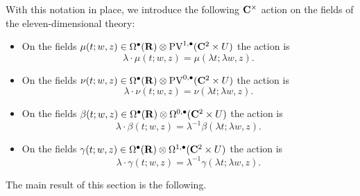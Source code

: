 \documentclass[11pt]{amsart}
\begin{document}
With this notation in place, we introduce the following $\mathbf{C}^\times$ action on the fields of the eleven-dimensional theory:
\begin{itemize}
\item On the fields $\mu(t;w,z) \in \Omega^\bullet(\mathbf{R}) \otimes {\rm PV}^{1,\bullet}(\mathbf{C}^2 \times U)$ the action is
\[
\lambda \cdot \mu(t;w,z) = \mu(\lambda t;\lambda w , z).
\]
\item On the fields $\nu(t;w,z) \in \Omega^\bullet(\mathbf{R}) \otimes {\rm PV}^{0,\bullet}(\mathbf{C}^2 \times U)$ the action is
\[
\lambda \cdot \nu(t;w,z) = \nu(\lambda t;\lambda w , z).
\]
\item On the fields $\beta(t;w,z) \in \Omega^\bullet(\mathbf{R}) \otimes \Omega^{0,\bullet}(\mathbf{C}^2 \times U)$ the action is
\[
\lambda \cdot \beta(t;w,z) = \lambda^{-1} \beta(\lambda t;\lambda w , z).
\]
\item On the fields $\gamma(t;w,z) \in \Omega^\bullet(\mathbf{R}) \otimes \Omega^{1,\bullet}(\mathbf{C}^2 \times U)$ the action is
\[
\lambda \cdot \gamma(t;w,z) = \lambda^{-1} \gamma(\lambda t;\lambda w , z).
\]
\end{itemize}

The main result of this section is the following. 
\end{document}

